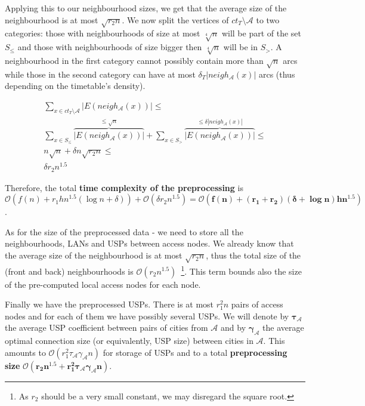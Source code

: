 		\noindent Applying this to our neighbourhood sizes, we get that the average size of the neighbourhood is at most $\sqrt{r_{2}n}$.  We now split the vertices of $ct_{T} \setminus \mathcal{A}$ to two categories: those with neighbourhoods of size at most $\sqrt[4]{n}$ will be part of the set $S_{\leq}$ and those with neighbourhoods of size bigger then $\sqrt[4]{n}$ will be in $S_{>}$. A neighbourhood in the first category cannot possibly contain more than $\sqrt{n}$ arcs while those in the second category can have at most $\delta_{T}|neigh_{\mathcal{A}}(x)|$ arcs (thus depending on the timetable's density).
		
		\begin{align*}
		\sum_{x \in ct_{T} \setminus \mathcal{A}} |E(neigh_{\mathcal{A}}(x))| \leq \\
		\sum_{x \in S_{\leq}} \overbrace{|E(neigh_{\mathcal{A}}(x))|}^{\leq \sqrt{n}} + 
			\sum_{x \in S_{>}} \overbrace{|E(neigh_{\mathcal{A}}(x))|}^{\leq \delta|neigh_{\mathcal{A}}(x)|} \leq \\
		n \sqrt{n} + \delta n \sqrt{r_{2}n} \leq \\
		\delta r_{2} n^{1.5}
		\end{align*}
		
		\noindent Therefore, the total \textbf{time complexity of the preprocessing} is $\mathcal{O}(f(n) + r_{1}hn^{1.5} (\log n + \delta)) + \mathcal{O}(\delta r_{2} n^{1.5}) = \bm{\mathcal{O}(f(n) + (r_{1} + r_{2}) (\delta + \log n) h n^{1.5})}$.
		
		As for the size of the preprocessed data - we need to store all the neighbourhoods, LANs and USPs between access nodes. We already know that the average size of the neighbourhood is at most $\sqrt{r_{2}n}$, thus the total size of the (front and back) neighbourhoods is $\mathcal{O}(r_{2} n^{1.5})$~\footnote{As $r_{2}$ should be a very small constant, we may disregard the square root.}. This term bounds also the size of the pre-computed local access nodes for each node.
		
		Finally we have the preprocessed USPs. There is at most $r_{1}^{2}n$ pairs of access nodes and for each of them we have possibly several USPs. We will denote by $\bm{\tau_{\mathcal{A}}}$ the average USP coefficient between pairs of cities from $\mathcal{A}$ and by $\bm{\gamma_{\mathcal{A}}}$ the average optimal connection size (or equivalently, USP size) between cities in $\mathcal{A}$. This amounts to $\mathcal{O}(r_{1}^{2} \tau_{\mathcal{A}} \gamma_{\mathcal{A}} n)$ for storage of USPs and to a total \textbf{preprocessing size} $\bm{\mathcal{O}(r_{2} n^{1.5} + r_{1}^{2} \tau_{\mathcal{A}} \gamma_{\mathcal{A}} n)}$.
		

